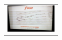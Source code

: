 \documentclass{acm_proc_article-sp}
\newcommand{\thumbheight}{14mm}
\newenvironment{thumbsequence}{}{\makebox[4mm]{}}
\begin{document}
\begin{figure}
\begin{tabular}{p{\textwidth}}
\begin{thumbsequence}
		\includegraphics[height=\thumbheight]{resources/free/looseduplicate6.jpg}
	\end{thumbsequence}
\end{tabular}

\vspace{.5em}


\end{figure}
\end{document}
